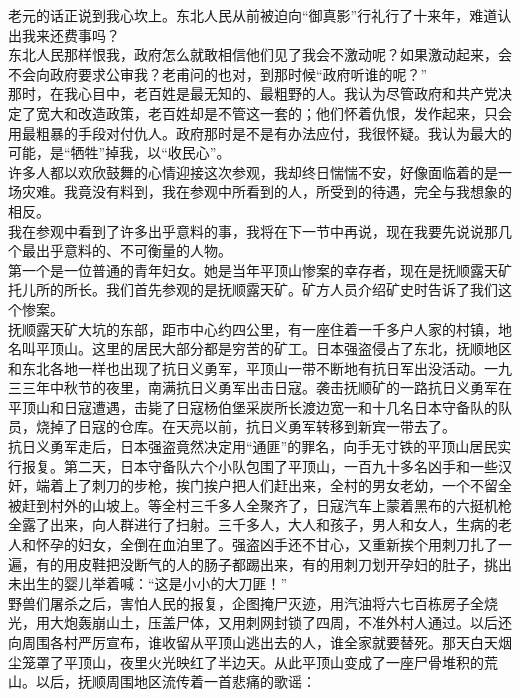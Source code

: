 老元的话正说到我心坎上。东北人民从前被迫向“御真影”行礼行了十来年，难道认出我来还费事吗？\\

东北人民那样恨我，政府怎么就敢相信他们见了我会不激动呢？如果激动起来，会不会向政府要求公审我？老甫问的也对，到那时候“政府听谁的呢？”\\

那时，在我心目中，老百姓是最无知的、最粗野的人。我认为尽管政府和共产党决定了宽大和改造政策，老百姓却是不管这一套的；他们怀着仇恨，发作起来，只会用最粗暴的手段对付仇人。政府那时是不是有办法应付，我很怀疑。我认为最大的可能，是“牺牲”掉我，以“收民心”。\\

许多人都以欢欣鼓舞的心情迎接这次参观，我却终日惴惴不安，好像面临着的是一场灾难。我竟没有料到，我在参观中所看到的人，所受到的待遇，完全与我想象的相反。\\

我在参观中看到了许多出乎意料的事，我将在下一节中再说，现在我要先说说那几个最出乎意料的、不可衡量的人物。\\

第一个是一位普通的青年妇女。她是当年平顶山惨案的幸存者，现在是抚顺露天矿托儿所的所长。我们首先参观的是抚顺露天矿。矿方人员介绍矿史时告诉了我们这个惨案。\\

抚顺露天矿大坑的东部，距市中心约四公里，有一座住着一千多户人家的村镇，地名叫平顶山。这里的居民大部分都是穷苦的矿工。日本强盗侵占了东北，抚顺地区和东北各地一样也出现了抗日义勇军，平顶山一带不断地有抗日军出没活动。一九三三年中秋节的夜里，南满抗日义勇军出击日寇。袭击抚顺矿的一路抗日义勇军在平顶山和日寇遭遇，击毙了日寇杨伯堡采炭所长渡边宽一和十几名日本守备队的队员，烧掉了日寇的仓库。在天亮以前，抗日义勇军转移到新宾一带去了。\\

抗日义勇军走后，日本强盗竟然决定用“通匪”的罪名，向手无寸铁的平顶山居民实行报复。第二天，日本守备队六个小队包围了平顶山，一百九十多名凶手和一些汉奸，端着上了刺刀的步枪，挨门挨户把人们赶出来，全村的男女老幼，一个不留全被赶到村外的山坡上。等全村三千多人全聚齐了，日寇汽车上蒙着黑布的六挺机枪全露了出来，向人群进行了扫射。三千多人，大人和孩子，男人和女人，生病的老人和怀孕的妇女，全倒在血泊里了。强盗凶手还不甘心，又重新挨个用刺刀扎了一遍，有的用皮鞋把没断气的人的肠子都踢出来，有的用刺刀划开孕妇的肚子，挑出未出生的婴儿举着喊：“这是小小的大刀匪！”\\

野兽们屠杀之后，害怕人民的报复，企图掩尸灭迹，用汽油将六七百栋房子全烧光，用大炮轰崩山土，压盖尸体，又用刺网封锁了四周，不准外村人通过。以后还向周围各村严厉宣布，谁收留从平顶山逃出去的人，谁全家就要替死。那天白天烟尘笼罩了平顶山，夜里火光映红了半边天。从此平顶山变成了一座尸骨堆积的荒山。以后，抚顺周围地区流传着一首悲痛的歌谣：\\

